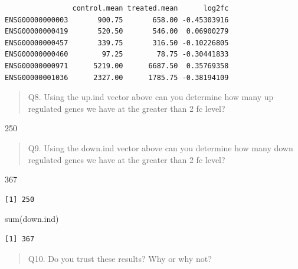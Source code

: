 \documentclass[
  letterpaper,
  DIV=11,
  numbers=noendperiod]{scrartcl}
\newenvironment{Shaded}{\begin{snugshade}}{\end{snugshade}}
\newcommand{\DecValTok}[1]{\textcolor[rgb]{0.68,0.00,0.00}{#1}}
\newcommand{\FunctionTok}[1]{\textcolor[rgb]{0.28,0.35,0.67}{#1}}
\newcommand{\NormalTok}[1]{\textcolor[rgb]{0.00,0.23,0.31}{#1}}
\newcommand{\OtherTok}[1]{\textcolor[rgb]{0.00,0.23,0.31}{#1}}
\newcommand{\SpecialCharTok}[1]{\textcolor[rgb]{0.37,0.37,0.37}{#1}}
\begin{document}
\begin{verbatim}
                control.mean treated.mean      log2fc
ENSG00000000003       900.75       658.00 -0.45303916
ENSG00000000419       520.50       546.00  0.06900279
ENSG00000000457       339.75       316.50 -0.10226805
ENSG00000000460        97.25        78.75 -0.30441833
ENSG00000000971      5219.00      6687.50  0.35769358
ENSG00000001036      2327.00      1785.75 -0.38194109
\end{verbatim}

\begin{quote}
Q8. Using the up.ind vector above can you determine how many up
regulated genes we have at the greater than 2 fc level?
\end{quote}

250

\begin{quote}
Q9. Using the down.ind vector above can you determine how many down
regulated genes we have at the greater than 2 fc level?
\end{quote}

367

\begin{Shaded}
\end{Shaded}

\begin{verbatim}
[1] 250
\end{verbatim}

\begin{Shaded}
\begin{Highlighting}[]
\FunctionTok{sum}\NormalTok{(down.ind)}
\end{Highlighting}
\end{Shaded}

\begin{verbatim}
[1] 367
\end{verbatim}

\begin{quote}
Q10. Do you trust these results? Why or why not?
\end{quote}
\end{document}
